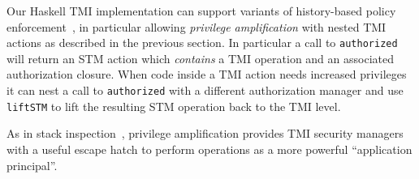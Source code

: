 Our Haskell TMI implementation can support variants of
history-based policy enforcement~\cite{HBAC},
in particular
allowing \emph{privilege amplification} with nested TMI actions as described in
the previous section.
%
In particular a call to \lstinline+authorized+ will return
an STM action which {\em contains} a TMI operation and an associated
authorization closure. When
code inside a TMI action needs increased privileges it can nest a call to \lstinline+authorized+
with a different authorization manager and use \lstinline+liftSTM+ to lift the resulting
STM operation back to the TMI level.

As in stack inspection~\cite{GordonFournetPOPL},
privilege amplification provides 
TMI security managers with
a useful 
escape hatch to perform operations as a more powerful ``application principal''.
%

